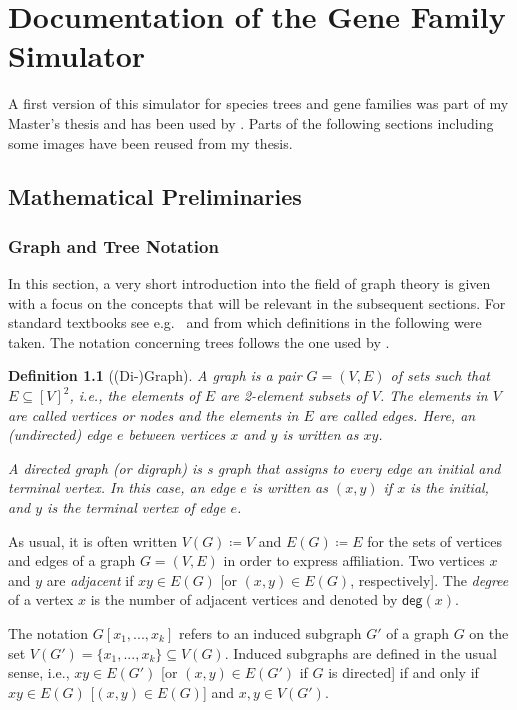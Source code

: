 \documentclass[hidelinks,11pt]{scrreprt}
\newtheorem{definition}[theorem]{Definition}
\newcommand{\degree}{\mathsf{deg}}
\begin{document}
\chapter{Documentation of the Gene Family Simulator}\label{sec:doc}

A first version of this simulator for species trees and gene families was part of my Master's thesis \citep{schaller2019} and has been used by \citet{stadler2020}.
Parts of the following sections including some images have been reused from my thesis.

\section{Mathematical Preliminaries}
\label{sec:prelim}

\subsection{Graph and Tree Notation}
In this section, a very short introduction into the field of graph theory is given with a focus on the concepts that will be relevant in the subsequent sections.
For standard textbooks see e.g.\ \cite{diestel2017} and \citet{semple2003} from which definitions in the following were taken. The notation concerning trees follows the one used by \citet{geiss2019a}.

\begin{definition}[(Di-)Graph]
	A \emph{graph} is a pair $G=(V,E)$ of sets such that $E \subseteq [V]^2$, i.e., the elements of $E$ are 2-element subsets of $V$. The elements in $V$ are called vertices or nodes and the elements in $E$ are called edges. Here, an (undirected) edge $e$ between vertices $x$ and $y$ is written as $xy$.
	
	A \emph{directed graph} (or \emph{digraph}) is s graph that assigns to every edge an initial and terminal vertex. In this case, an edge $e$ is written as $(x,y)$ if $x$ is the initial, and $y$ is the terminal vertex of edge $e$.
\end{definition}

As usual, it is often written $V(G)\coloneqq V$ and $E(G)\coloneqq E$ for the sets of vertices and edges of a graph $G=(V,E)$ in order to express affiliation. Two vertices $x$ and $y$ are \emph{adjacent} if $xy\in E(G)$ [or $(x,y)\in E(G)$, respectively]. The \emph{degree} of a vertex $x$ is the number of adjacent vertices and denoted by $\degree(x)$.

The notation $G[x_1,...,x_k]$ refers to an induced subgraph $G'$ of a graph $G$ on the set $V(G')=\{x_1,...,x_k\}\subseteq V(G)$. Induced subgraphs are defined in the usual sense, i.e., $xy\in E(G')$ [or $(x,y)\in E(G')$ if $G$ is directed] if and only if $xy\in E(G)$ [$(x,y)\in E(G)$] and $x,y\in V(G')$.
\end{document}
